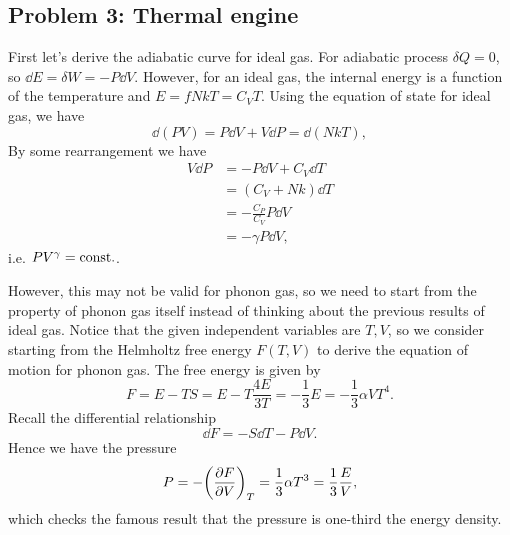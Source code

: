 \documentclass[10pt]{article}
\begin{document}
\subsection{Problem 3: Thermal engine}
First let's derive the adiabatic curve for ideal gas. For adiabatic process $\delta Q = 0$, so $\dd{E} = \delta W = -P \dd{V}$. However, for an ideal gas, the internal energy is a function of the temperature and $E = f Nk T = C_V T$. Using the equation of state for ideal gas, we have 
\begin{equation}
	\dd(PV) = P \dd{V} + V \dd{P} = \dd(NkT),
\end{equation}
By some rearrangement we have 
\begin{align*}
	V \dd{P} &= - P \dd{V} + C_V \dd{T}\\
			 &= (C_V + Nk) \dd{T} \\
			 &= -\frac{C_P}{C_V} P \dd{V} \\
			 &= - \gamma P \dd{V},
\end{align*}
i.e. $PV^{\gamma} = {\mathrm{const.}}$. 

However, this may not be valid for phonon gas, so we need to start from the property of phonon gas itself instead of thinking about the previous results of ideal gas. Notice that the given independent variables are $T,V$, so we consider starting from the Helmholtz free energy $F(T,V)$ to derive the equation of motion for phonon gas. The free energy is given by
\begin{equation}
	F = E - TS = E - T \frac{4E}{3T} = -\frac{1}{3} E = -\frac{1}{3} \alpha V T^4. 
\end{equation}
Recall the differential relationship 
\begin{equation}
	\dd{F} = -S \dd{T} - P \dd{V}.
\end{equation}
Hence we have the pressure 
\begin{equation}
	P = -\qty(\pdv{F}{V})_T = \frac{1}{3} \alpha T^3 = \frac{1}{3} \frac{E}{V},
\end{equation}
which checks the famous result that the pressure is one-third the energy density.  
\end{document}
